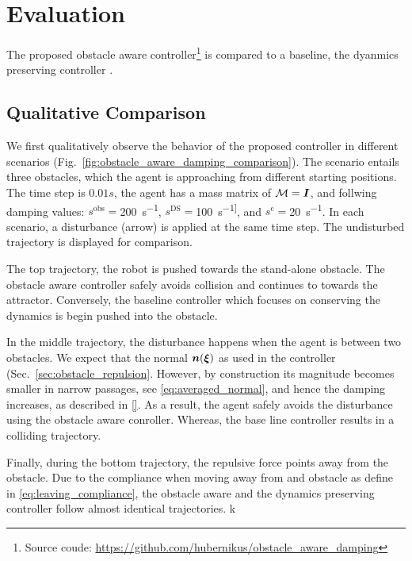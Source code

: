 \section{Evaluation}  \label{sec:evaluation} 
The proposed obstacle aware controller\footnote{Source coude: \url{https://github.com/hubernikus/obstacle_aware_damping}} is compared to a baseline, the dyanmics preserving controller \cite{kronander2015passive}.


\subsection{Qualitative Comparison} \label{sec:qual_comp}
We first qualitatively observe the behavior of the proposed controller in different scenarios (Fig.~\ref{fig:obstacle_aware_damping_comparison}). The scenario entails three obstacles, which the agent is approaching from different starting positions. The time step is $0.01 s$, the agent has a mass matrix of $\mathcal{M} = \boldsymbol{I}$, and follwing damping values: 
$s^{\mathrm{obs}}=$\qty{200}{s^{-1}},
$s^{\mathrm{DS}}=$\qty{100}{s^{-1]}}, and
$s^{\mathrm{c}}=$\qty{20}{s^{-1}}.
In each scenario, a disturbance (arrow) is applied at the same time step.
The undisturbed trajectory is displayed for comparison.

The top trajectory, the robot is pushed towards the stand-alone obstacle. The obstacle aware controller safely avoids collision and continues to towards the attractor. Conversely, the baseline controller which focuses on conserving the dynamics is begin pushed into the obstacle. 

In the middle trajectory, the disturbance happens when the agent is between two obstacles. We expect that the normal $\boldsymbol{n}(\boldsymbol{\xi})$ as used in the controller (Sec.~\ref{sec:obstacle_repulsion}.
However, by construction its magnitude becomes smaller in narrow passages, see \eqref{eq:averaged_normal}, and hence the damping increases, as described in \eqref{}.
As a result, the agent safely avoids the disturbance using the obstacle aware conroller. Whereas, the base line controller results in a colliding trajectory.

Finally, during the bottom trajectory, the repulsive force points away from the obstacle. Due to the compliance when moving away from and obstacle as define in \eqref{eq:leaving_compliance}, the obstacle aware and the dynamics preserving controller follow almost identical trajectories.
k

